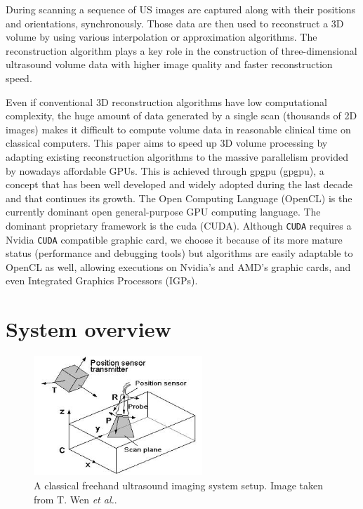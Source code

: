 \documentclass[12pt,journal,compsoc]{IEEEtran}
\begin{document}
During scanning a sequence of US images are captured along with their positions and orientations, synchronously. Those data are then used to reconstruct a 3D volume by using various interpolation or approximation algorithms. The reconstruction algorithm plays a key role in the construction of three-dimensional ultrasound volume data with higher image quality and faster reconstruction speed.\par

Even if conventional 3D reconstruction algorithms have low computational complexity, the huge amount of data generated by a single scan (thousands of 2D images) makes it difficult to compute volume data in reasonable clinical time on classical computers.
This paper aims to speed up 3D volume processing by adapting existing reconstruction algorithms to the massive parallelism provided by nowadays affordable GPUs. This is achieved through \acl{gpgpu} (\ac{gpgpu}), a concept that has been well developed and widely adopted during the last decade and that continues its growth.
The Open Computing Language (OpenCL) is the currently dominant open general-purpose GPU computing language. The dominant proprietary framework is the \acl{cuda} (CUDA).
Although \texttt{CUDA} requires a Nvidia \texttt{CUDA} compatible graphic card, we choose it because of its more mature status (performance and debugging tools) but algorithms are easily adaptable to OpenCL as well, allowing executions on Nvidia's and AMD's graphic cards, and even Integrated Graphics Processors (IGPs).


\section{System overview}

\begin{figure}[!ht]
\centering
\includegraphics[width=2.5in]{freehand}
\caption{A classical freehand ultrasound imaging system setup. Image taken from T. Wen \textit{et al.}\textbf{\cite{2}}.}
\label{fig_1}
\end{figure}
\end{document}
